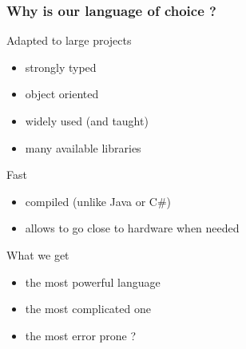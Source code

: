 \begin{frame}
  \frametitle{Why is \cpp our language of choice ?}
  \begin{block}{Adapted to large projects}
    \begin{itemize}
    \item strongly typed
    \item object oriented
    \item widely used (and taught)
    \item many available libraries
    \end{itemize}
  \end{block}
  \pause
  \begin{block}{Fast}
    \begin{itemize}
    \item compiled (unlike Java or C\#)
    \item allows to go close to hardware when needed
    \end{itemize}
  \end{block}
  \pause
  \begin{alertblock}{What we get}
    \begin{itemize}
    \item the most powerful language
    \item the most complicated one
    \item the most error prone ?
    \end{itemize}
  \end{alertblock}
\end{frame}
